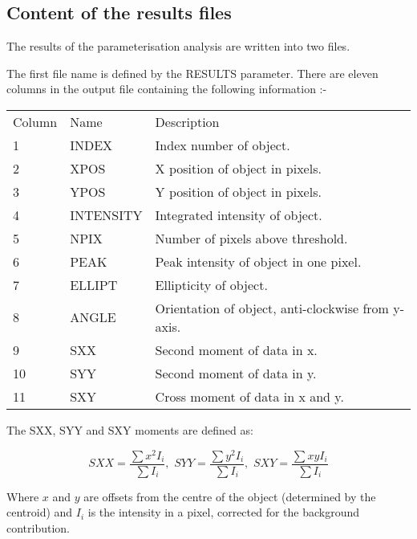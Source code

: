 \subsection{Content\label{RESULTS} of the results files}
The results of the parameterisation analysis are written into two
files.

The first file name is defined by the RESULTS parameter. There are
eleven columns in the output file containing the following information
:-

\begin{center}
\begin{tabular}{lll}
Column & Name  & Description \\
1 & INDEX & Index number of object.\\
2 & XPOS & X position of object in pixels.\\
3 & YPOS & Y position of object in pixels.\\
4 & INTENSITY & Integrated intensity of object.\\
5 & NPIX & Number of pixels above threshold.\\
6 & PEAK & Peak intensity of object in one pixel.\\
7 & ELLIPT & Ellipticity of object.\\
8 & ANGLE & Orientation of object, anti-clockwise from y-axis.\\
9 & SXX & Second moment of data in x.\\
10 & SYY & Second moment of data in y.\\
11 & SXY & Cross moment of data in x and y.\\
\end{tabular}
\end{center}

The SXX, SYY and SXY moments are defined as:
\begin{center}
\begin{displaymath}
SXX = \frac{\sum{x^{2}I_{i}}}{\sum{I_{i}}}, \, \,
SYY = \frac{\sum{y^{2}I_{i}}}{\sum{I_{i}}}, \, \,
SXY = \frac{\sum{xyI_{i}}}{\sum{I_{i}}}
\end{displaymath}
\end{center}
Where $x$ and $y$ are offsets from the centre of the object (determined
by the centroid) and $I_{i}$ is the intensity in a pixel, corrected for
the background contribution.

